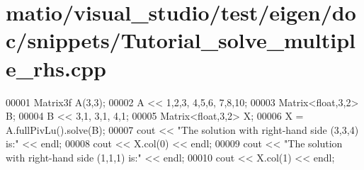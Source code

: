 \hypertarget{matio_2visual__studio_2test_2eigen_2doc_2snippets_2_tutorial__solve__multiple__rhs_8cpp_source}{}\section{matio/visual\+\_\+studio/test/eigen/doc/snippets/\+Tutorial\+\_\+solve\+\_\+multiple\+\_\+rhs.cpp}
\label{matio_2visual__studio_2test_2eigen_2doc_2snippets_2_tutorial__solve__multiple__rhs_8cpp_source}

\begin{DoxyCode}
00001 Matrix3f A(3,3);
00002 A << 1,2,3,  4,5,6,  7,8,10;
00003 Matrix<float,3,2> B;
00004 B << 3,1, 3,1, 4,1;
00005 Matrix<float,3,2> X;
00006 X = A.fullPivLu().solve(B);
00007 cout << \textcolor{stringliteral}{"The solution with right-hand side (3,3,4) is:"} << endl;
00008 cout << X.col(0) << endl;
00009 cout << \textcolor{stringliteral}{"The solution with right-hand side (1,1,1) is:"} << endl;
00010 cout << X.col(1) << endl;
\end{DoxyCode}
